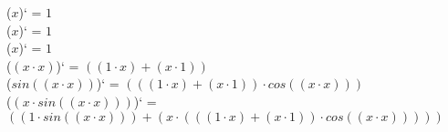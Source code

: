 \documentclass[12pt,a4paper,fleqn]{article}
\begin{document}
($x$)` = $1$\\
($x$)` = $1$\\
($x$)` = $1$\\
($(x \cdot x)$)` = $((1 \cdot x) + (x \cdot 1))$\\
($sin((x \cdot x))$)` = $(((1 \cdot x) + (x \cdot 1)) \cdot cos((x \cdot x)))$\\
($(x \cdot sin((x \cdot x)))$)` = $((1 \cdot sin((x \cdot x))) + (x \cdot (((1 \cdot x) + (x \cdot 1)) \cdot cos((x \cdot x)))))$\\
\end{document}

